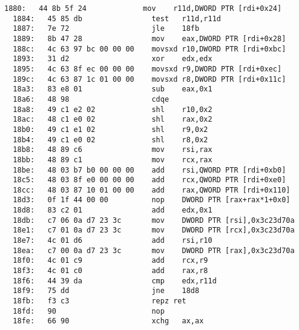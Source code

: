 \begin{lstlisting}[title=Función setCavityFlowSpeeds con optimización -O2]
  1880:   44 8b 5f 24             mov    r11d,DWORD PTR [rdi+0x24]
  1884:   45 85 db                test   r11d,r11d
  1887:   7e 72                   jle    18fb
  1889:   8b 47 28                mov    eax,DWORD PTR [rdi+0x28]
  188c:   4c 63 97 bc 00 00 00    movsxd r10,DWORD PTR [rdi+0xbc]
  1893:   31 d2                   xor    edx,edx
  1895:   4c 63 8f ec 00 00 00    movsxd r9,DWORD PTR [rdi+0xec]
  189c:   4c 63 87 1c 01 00 00    movsxd r8,DWORD PTR [rdi+0x11c]
  18a3:   83 e8 01                sub    eax,0x1
  18a6:   48 98                   cdqe   
  18a8:   49 c1 e2 02             shl    r10,0x2
  18ac:   48 c1 e0 02             shl    rax,0x2
  18b0:   49 c1 e1 02             shl    r9,0x2
  18b4:   49 c1 e0 02             shl    r8,0x2
  18b8:   48 89 c6                mov    rsi,rax
  18bb:   48 89 c1                mov    rcx,rax
  18be:   48 03 b7 b0 00 00 00    add    rsi,QWORD PTR [rdi+0xb0]
  18c5:   48 03 8f e0 00 00 00    add    rcx,QWORD PTR [rdi+0xe0]
  18cc:   48 03 87 10 01 00 00    add    rax,QWORD PTR [rdi+0x110]
  18d3:   0f 1f 44 00 00          nop    DWORD PTR [rax+rax*1+0x0]
  18d8:   83 c2 01                add    edx,0x1
  18db:   c7 06 0a d7 23 3c       mov    DWORD PTR [rsi],0x3c23d70a
  18e1:   c7 01 0a d7 23 3c       mov    DWORD PTR [rcx],0x3c23d70a
  18e7:   4c 01 d6                add    rsi,r10
  18ea:   c7 00 0a d7 23 3c       mov    DWORD PTR [rax],0x3c23d70a
  18f0:   4c 01 c9                add    rcx,r9
  18f3:   4c 01 c0                add    rax,r8
  18f6:   44 39 da                cmp    edx,r11d
  18f9:   75 dd                   jne    18d8
  18fb:   f3 c3                   repz ret 
  18fd:   90                      nop
  18fe:   66 90                   xchg   ax,ax
\end{lstlisting}

